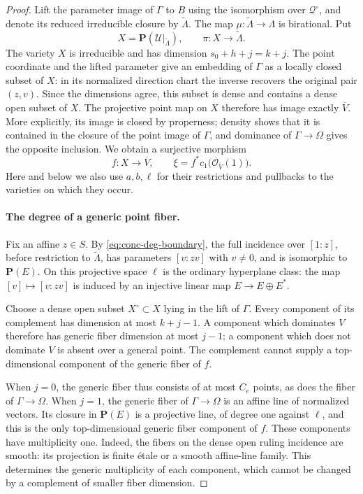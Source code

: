 \begin{proof}
Lift the parameter image of $\Gamma$ to $B$ using the isomorphism over $\mathcal{Q}^\circ$, and denote its reduced irreducible closure by $\widetilde\Lambda$.  The map $\mu:\widetilde\Lambda\to\Lambda$ is birational.  Put
\[
 X=\mathbf{P}(\mathcal{U}|_{\widetilde\Lambda}),
 \qquad \pi:X\longrightarrow\widetilde\Lambda.
\]
The variety $X$ is irreducible and has dimension $s_0+h+j=k+j$.  The point coordinate and the lifted parameter give an embedding of $\Gamma$ as a locally closed subset of $X$: in its normalized direction chart the inverse recovers the original pair $(z,v)$.  Since the dimensions agree, this subset is dense and contains a dense open subset of $X$. The projective point map on $X$ therefore has image exactly $\overline V$.  More explicitly, its image is closed by properness; density shows that it is contained in the closure of the point image of $\Gamma$, and dominance of $\Gamma\to\Omega$ gives the opposite inclusion.  We obtain a surjective morphism
\[
 f:X\longrightarrow\overline V,
 \qquad
 \xi=f^*c_1\bigl(\mathcal{O}_{\overline V}(1)\bigr).
\]
Here and below we also use $a,b,\ell$ for their restrictions and pullbacks to the varieties on which they occur.

\paragraph{The degree of a generic point fiber.}
Fix an affine $z\in S$.  By \eqref{eq:conc-deg-boundary}, the full incidence over $[1:z]$, before restriction to $\widetilde\Lambda$, has parameters $[v:zv]$ with $v\ne0$, and is isomorphic to $\mathbf{P}(E)$. On this projective space $\ell$ is the ordinary hyperplane class: the map $[v]\mapsto[v:zv]$ is induced by an injective linear map $E\to E\oplus E^*$.

Choose a dense open subset $X^\circ\subset X$ lying in the lift of $\Gamma$.  Every component of its complement has dimension at most $k+j-1$.  A component which dominates $V$ therefore has generic fiber dimension at most $j-1$; a component which does not dominate $V$ is absent over a general point.  The complement cannot supply a top-dimensional component of the generic fiber of $f$.

When $j=0$, the generic fiber thus consists of at most $C_e$ points, as does the fiber of $\Gamma\to\Omega$.  When $j=1$, the generic fiber of $\Gamma\to\Omega$ is an affine line of normalized vectors.  Its closure in $\mathbf{P}(E)$ is a projective line, of degree one against $\ell$, and this is the only top-dimensional generic fiber component of $f$. These components have multiplicity one.  Indeed, the fibers on the dense open ruling incidence are smooth: its projection is finite \'etale or a smooth affine-line family.  This determines the generic multiplicity of each component, which cannot be changed by a complement of smaller fiber dimension.


\end{proof}
